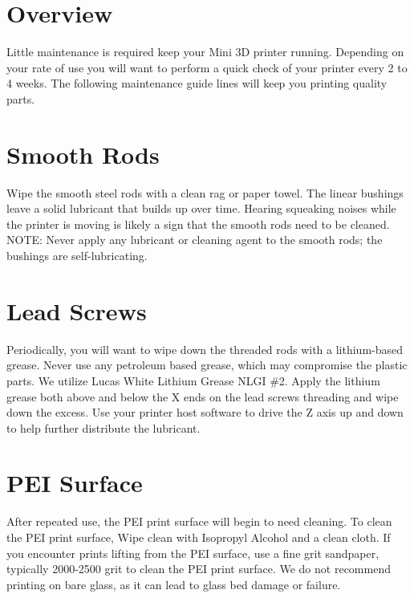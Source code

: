 %
%
%
%
%

\section{Overview}
Little maintenance is required keep your Mini 3D printer running. Depending on your rate of use you will want to perform a quick check of your printer every 2 to 4 weeks. The following maintenance guide lines will keep you printing quality parts.

\section{Smooth Rods}
Wipe the smooth steel rods with a clean rag or paper towel. The linear bushings leave a solid lubricant that builds up over time. Hearing squeaking noises while the printer is moving is likely a sign that the smooth rods need to be cleaned. NOTE: Never apply any lubricant or cleaning agent to the smooth rods; the bushings are self-lubricating.

\section{Lead Screws}
Periodically, you will want to wipe down the threaded rods with a lithium-based grease. Never use any petroleum based grease, which may compromise the plastic parts. We utilize Lucas White Lithium Grease NLGI \#2. Apply the lithium grease both above and below the X ends on the lead screws threading and wipe down the excess. Use your printer host software to drive the Z axis up and down to help further distribute the lubricant.

\section{PEI Surface}
After repeated use, the PEI print surface will begin to need cleaning. To clean the PEI print surface, Wipe clean with Isopropyl Alcohol and a clean cloth. If you encounter prints lifting from the PEI surface, use a fine grit sandpaper, typically 2000-2500 grit to clean the PEI print surface. We do not recommend printing on bare glass, as it can lead to glass bed damage or failure.

